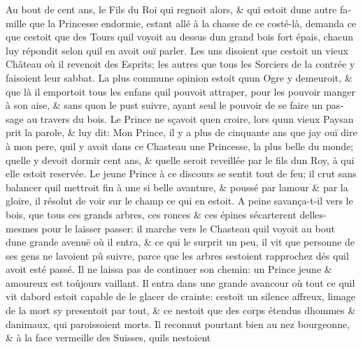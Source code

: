 \documentclass[14pt,a4paper]{memoir}
\begin{document}
{{\begin{otherlanguage}{french}
Au bout de cent ans, le Fils du Roi qui regnoit alors, \& qui estoit
d\textquotesingle une autre famille que la Princesse endormie, estant
allé à la chasse de ce costé-là, demanda ce que c\textquotesingle estoit
que des Tours qu\textquotesingle il voyoit au dessus
d\textquotesingle un grand bois fort épais, chacun luy répondit selon
qu\textquotesingle il en avoit ouï parler. Les uns disoient que
c\textquotesingle estoit un vieux Château où il revenoit des Esprits;
les autres que tous les Sorciers de la contrée y faisoient leur sabbat.
La plus commune opinion estoit qu\textquotesingle un Ogre y demeuroit,
\& que là il emportoit tous les enfans qu\textquotesingle il pouvoit
attraper, pour les pouvoir manger à son aise, \& sans
qu\textquotesingle on le pust suivre, ayant seul le pouvoir de se faire
un passage au travers du bois. Le Prince ne sçavoit
qu\textquotesingle en croire, lors qu\textquotesingle un vieux Paysan
prit la parole, \& luy dit: Mon Prince, il y a plus de cinquante ans que
j\textquotesingle ay ouï dire à mon pere, qu\textquotesingle il y avoit
dans ce Chasteau une Princesse, la plus belle du monde;
qu\textquotesingle elle y devoit dormir cent ans, \&
qu\textquotesingle elle seroit reveillée par le fils
d\textquotesingle un Roy, à qui elle estoit reservée. Le jeune Prince à
ce discours se sentit tout de feu; il crut sans balancer
qu\textquotesingle il mettroit fin à une si belle avanture, \& poussé
par l\textquotesingle amour \& par la gloire, il résolut de voir sur le
champ ce qui en estoit. A peine s\textquotesingle avança-t-il vers le
bois, que tous ces grands arbres, ces ronces \& ces épines
s\textquotesingle écarterent d\textquotesingle elles-mesmes pour le
laisser passer: il marche vers le Chasteau qu\textquotesingle il voyoit
au bout d\textquotesingle une grande avenuë où il entra, \& ce qui le
surprit un peu, il vit que personne de ses gens ne
l\textquotesingle avoient pû suivre, parce que les arbres
s\textquotesingle estoient rapprochez dés qu\textquotesingle il avoit
esté passé. Il ne laissa pas de continuer son chemin: un Prince jeune \&
amoureux est toûjours vaillant. Il entra dans une grande avancour où
tout ce qu\textquotesingle il vit d\textquotesingle abord estoit capable
de le glacer de crainte: c\textquotesingle estoit un silence affreux,
l\textquotesingle image de la mort s\textquotesingle y presentoit par
tout, \& ce n\textquotesingle estoit que des corps étendus
d\textquotesingle hommes \& d\textquotesingle animaux, qui paroissoient
morts. Il reconnut pourtant bien au nez bourgeonne, \& à la face
vermeille des Suisses, qu\textquotesingle ils n\textquotesingle estoient

\end{otherlanguage}}}
\end{document}
